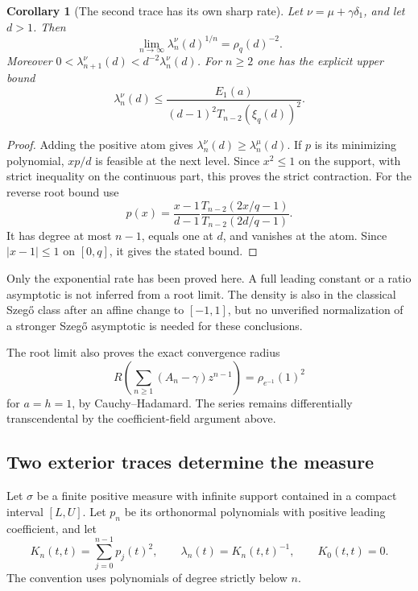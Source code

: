 \documentclass[11pt,a4paper]{article}
\newtheorem{corollary}[theorem]{Corollary}
\theoremstyle{definition}
\theoremstyle{remark}
\theoremstyle{plain}
\numberwithin{equation}{section}
\begin{document}
\begin{corollary}[The second trace has its own sharp rate]
\label{sc:sc:second-rate}
Let $\nu=\mu+\gamma\delta_1$, and let $d>1$. Then
\[
 \lim_{n\to\infty}\lambda_n^\nu(d)^{1/n}=\rho_q(d)^{-2}.
\]
Moreover $0<\lambda_{n+1}^\nu(d)<d^{-2}\lambda_n^\nu(d)$.
For $n\ge2$ one has the explicit upper bound
\[
 \lambda_n^\nu(d)\le
 \frac{E_1(a)}{(d-1)^2T_{n-2}(\xi_q(d))^2}.
\]
\end{corollary}
\begin{proof}
Adding the positive atom gives $\lambda_n^\nu(d)\ge\lambda_n^\mu(d)$.
If $p$ is its minimizing polynomial, $xp/d$ is feasible at the next
level. Since $x^2\le1$ on the support, with strict inequality on the
continuous part, this proves the strict contraction.
For the reverse root bound use
\[
 p(x)=\frac{x-1}{d-1}
       \frac{T_{n-2}(2x/q-1)}{T_{n-2}(2d/q-1)}.
\]
It has degree at most $n-1$, equals one at $d$, and vanishes at the
atom. Since $|x-1|\le1$ on $[0,q]$, it gives the stated bound.
\end{proof}

Only the exponential rate has been proved here.  A full leading
constant or a ratio asymptotic is not inferred from a root limit.
The density is also in the classical Szeg\H{o} class after an affine
change to $[-1,1]$, but no unverified normalization of a stronger
Szeg\H{o} asymptotic is needed for these conclusions.

The root limit also proves the exact convergence radius
\[
R\!\left(\sum_{n\ge1}(A_n-\gamma)z^{n-1}\right)
=\rho_{e^{-1}}(1)^2
\]
for $a=h=1$, by Cauchy--Hadamard. The series remains differentially
transcendental by the coefficient-field argument above.

\subsection{Two exterior traces determine the measure}

Let $\sigma$ be a finite positive measure with infinite support contained
in a compact interval $[L,U]$.  Let $p_n$ be its orthonormal polynomials
with positive leading coefficient, and let
\[
 K_n(t,t)=\sum_{j=0}^{n-1}p_j(t)^2,
 \qquad \lambda_n(t)=K_n(t,t)^{-1},\qquad K_0(t,t)=0.
\]
The convention uses polynomials of degree strictly below $n$.
\end{document}
